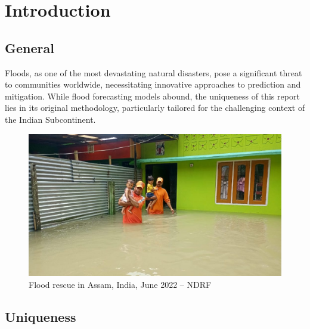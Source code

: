 \documentclass[a4paper,12pt]{report}
\begin{document}
\tableofcontents


\listoffigures  %


\listoftables  %



\chapter{Introduction}


\section{General}

Floods, as one of the most devastating natural disasters, pose a significant threat to communities worldwide, necessitating innovative approaches to prediction and mitigation. While flood forecasting models abound, the uniqueness of this report lies in its original methodology, particularly tailored for the challenging context of the Indian Subcontinent.

\vspace{0.5cm}

\begin{figure}[ht]
  \centering
  \includegraphics[width=\linewidth]{Flood-Introduction.jpeg}
  \caption{Flood rescue in Assam, India, June 2022 – NDRF}
\end{figure}


\section{Uniqueness}
\end{document}
